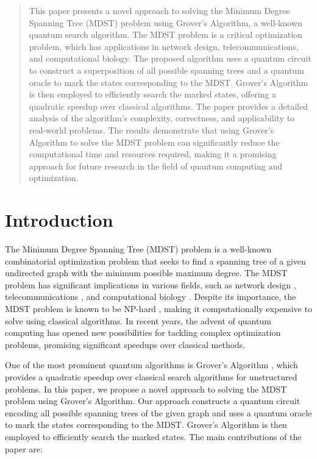 \begin{abstract}
This paper presents a novel approach to solving the Minimum Degree Spanning Tree (MDST) problem using Grover's Algorithm, a well-known quantum search algorithm. The MDST problem is a critical optimization problem, which has applications in network design, telecommunications, and computational biology. The proposed algorithm uses a quantum circuit to construct a superposition of all possible spanning trees and a quantum oracle to mark the states corresponding to the MDST. Grover's Algorithm is then employed to efficiently search the marked states, offering a quadratic speedup over classical algorithms. The paper provides a detailed analysis of the algorithm's complexity, correctness, and applicability to real-world problems. The results demonstrate that using Grover's Algorithm to solve the MDST problem can significantly reduce the computational time and resources required, making it a promising approach for future research in the field of quantum computing and optimization.

\end{abstract}

\section{Introduction}
\label{sec:introduction}

The Minimum Degree Spanning Tree (MDST) problem is a well-known combinatorial optimization problem that seeks to find a spanning tree of a given undirected graph with the minimum possible maximum degree. The MDST problem has significant implications in various fields, such as network design \cite{network}, telecommunications \cite{telecom}, and computational biology \cite{bio}. Despite its importance, the MDST problem is known to be NP-hard \cite{NP}, making it computationally expensive to solve using classical algorithms. In recent years, the advent of quantum computing has opened new possibilities for tackling complex optimization problems, promising significant speedups over classical methods.

One of the most prominent quantum algorithms is Grover's Algorithm \cite{grover}, which provides a quadratic speedup over classical search algorithms for unstructured problems. In this paper, we propose a novel approach to solving the MDST problem using Grover's Algorithm. Our approach constructs a quantum circuit encoding all possible spanning trees of the given graph and uses a quantum oracle to mark the states corresponding to the MDST. Grover's Algorithm is then employed to efficiently search the marked states. The main contributions of the paper are:

